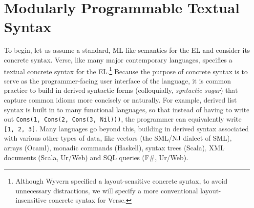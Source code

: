 \section{Modularly Programmable Textual Syntax}\label{sec:syntax}
To begin, let us assume a standard, ML-like semantics for the EL and consider its concrete syntax. Verse, like many major contemporary languages, specifies a textual concrete syntax for the EL.\footnote{Although Wyvern specified a layout-sensitive concrete syntax, to avoid unnecessary distractions, we will specify a more conventional layout-insensitive concrete syntax for Verse.} %
Because the purpose of concrete syntax is to serve as the programmer-facing user interface of the language, it is common practice to build in  derived syntactic forms (colloquially, \emph{syntactic sugar}) that capture common idioms more concisely or naturally. %
For example, derived list syntax is built in to many functional languages, so that instead of having to write out \lstinline{Cons(1, Cons(2, Cons(3, Nil)))}, the programmer can equivalently write \lstinline{[1, 2, 3]}. Many languages go beyond this, building in derived syntax associated with various other types of data, like vectors (the SML/NJ dialect of SML), arrays (Ocaml), monadic commands (Haskell), syntax trees (Scala), XML documents (Scala, Ur/Web) and SQL queries (F\#, Ur/Web). %

